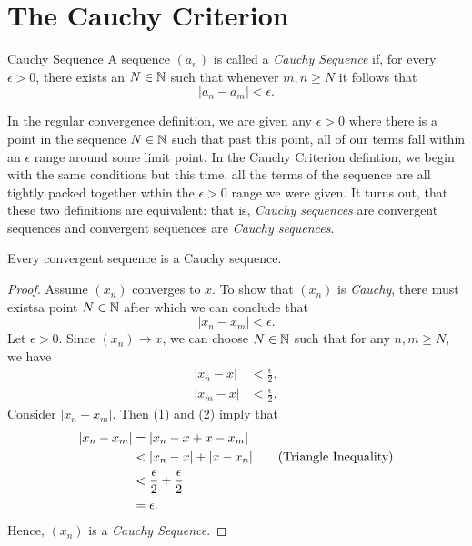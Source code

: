\section{The Cauchy Criterion}


\begin{definition}{Cauchy Sequence}{}
A sequence \((a_n)\) is called a \textit{Cauchy Sequence} if, for every \( \epsilon > 0 \), there exists an \( N \in \mathbb{N} \) such that whenever \( m,n \geq N \) it follows that 
\[ | a_n - a_m | < \epsilon.\]
\end{definition}

In the regular convergence definition, we are given any \( \epsilon > 0 \) where there is a point in the sequence \(N \in \mathbb{N} \) such that past this point, all of our terms fall within an \(\epsilon\) range around some limit point. In the Cauchy Criterion defintion, we begin with the same conditions but this time, all the terms of the sequence are all tightly packed together wthin the \(\epsilon > 0 \) range we were given. It turns out, that these two definitions are equivalent: that is, \textit{Cauchy sequences} are convergent sequences and convergent sequences are \textit{Cauchy sequences}. 

\begin{theorem}{}{}
Every convergent sequence is a Cauchy sequence. 
\end{theorem}

\begin{proof}
Assume \((x_n)\) converges to \(x\). To show that \((x_n)\) is \textit{Cauchy}, there must existsa point \( N \in \mathbb{N} \) after which we can conclude that 
\[ |x_n - x_m| < \epsilon. \]
Let \( \epsilon > 0 \). Since \( (x_n) \to x \), we can choose \( N \in \mathbb{N} \) such that for any \( n,m \geq N \), we have 
\begin{align*}
    |x_n - x|&< \frac{\epsilon}{2}, \tag{1} \\
    |x_m - x|&< \frac{\epsilon}{2}. \tag{2}
\end{align*}
Consider \( |x_n - x_m| \). Then (1) and (2) imply that 
\begin{align*}
    |x_n - x_m|&= |x_n - x + x - x_m| \\
               &< | x_n - x | + | x - x_n | \tag{\text{Triangle Inequality}}\\  
               &< \frac{\epsilon}{2} + \frac{\epsilon}{2} \\
               &= \epsilon.
\end{align*}
Hence, \((x_n)\) is a \textit{Cauchy Sequence}.
\end{proof}

